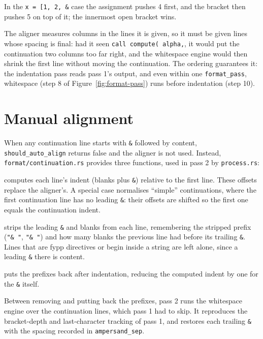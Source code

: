 \documentclass[11pt,a4paper,openany]{book}
\newcommand{\code}[1]{\texttt{\small #1}}
\newcommand{\file}[1]{\texttt{\small\color{accent}#1}}
\begin{document}
In the \code{x = [1, 2, \&} case the assignment pushes 4 first, and the bracket
then pushes 5 on top of it; the innermost open bracket wins.

\begin{keyidea}
The aligner measures columns in the lines it is given, so it must be given
lines whose spacing is final: had it seen \code{call  compute( alpha,}, it would
put the continuation two columns too far right, and the whitespace engine would
then shrink the first line without moving the continuation. The ordering
guarantees it: the indentation pass reads pass 1's output, and even within one
\code{format\_pass}, whitespace (step 8 of Figure~\ref{fig:format-pass}) runs
before indentation (step 10).
\end{keyidea}

\section{Manual alignment}\label{sec:manual}

When any continuation line starts with \code{\&} followed by content,
\code{should\_auto\_align} returns false and the aligner is not used.
Instead, \file{format/continuation.rs} provides three functions, used in
pass 2 by \code{process.rs}:

\begin{description}[font=\ttfamily\small]
  \item[get\_manual\_alignment] computes each line's indent (blanks plus
    \code{\&}) relative to the first line. These offsets replace the aligner's.
    A special case normalises ``simple'' continuations, where the first
    continuation line has no leading \code{\&}: their offsets are shifted so the
    first one equals the continuation indent.
  \item[remove\_pre\_ampersands] strips the leading \code{\&} and blanks from
    each line, remembering the stripped prefix (\code{"\& "}, \code{"\&   "})
    and how many blanks the previous line had before its trailing \code{\&}.
    Lines that are fypp directives or begin inside a string are left alone,
    since a leading \code{\&} there is content.
  \item[prepend\_ampersands] puts the prefixes back after indentation,
    reducing the computed indent by one for the \code{\&} itself.
\end{description}

Between removing and putting back the prefixes, pass 2 runs the whitespace engine
over the continuation lines, which pass 1 had to skip. It reproduces the
bracket-depth and last-character tracking of pass 1, and restores each trailing
\code{\&} with the spacing recorded in \code{ampersand\_sep}.
\end{document}
